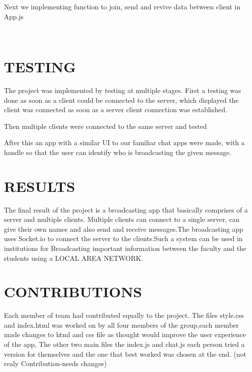 \documentclass{fisatproject}
\begin{document}
    

Next we implementing function to join, send and revive data between client in App.js
         \vspace{0.6cm}
 	 \begin{lstlisting}[language=java]
 	 
 	 \end{lstlisting}


\chapter{TESTING}
The project was implemented by testing at multiple stages.
First a testing was done as soon as a client could be connected to the server, which displayed the client was connected as soon as a server client connection was established.


Then multiple clients were connected to the same server and tested



After this an app with a similar UI to our familiar chat apps were made, with a handle so that the user can identify who is broadcasting the given message.
\chapter{RESULTS}


The final result of the project is a broadcasting app that basically comprises of a server and multiple clients. Multiple clients can connect to a single server, can give their own names and also send and receive messages.The broadcasting app uses Socket.io to connect the server to the clients.Such a system can be used in institutions for Broadcasting important information between the faculty and the students using a LOCAL AREA NETWORK.












\chapter{CONTRIBUTIONS}

Each member of team had contributed equally to the project. The files style.css and index.html was worked on by all four members of the group,each member made changes to html and css file as thought would improve the user experience of the app, The other two main files the index.js and chat.js each person tried a version for themselves and the one that best worked was chosen at the end. (not realy Contribution-needs changes)
\end{document}
